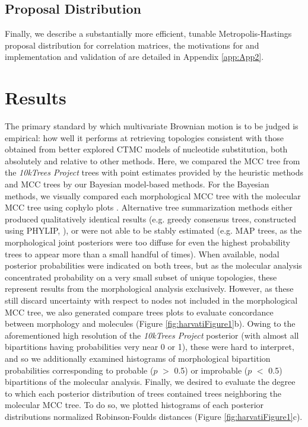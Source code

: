 \subsection{Proposal Distribution}
Finally, we describe a substantially more efficient, tunable Metropolis-Hastings proposal distribution for correlation matrices, the motivations for and implementation and validation of are detailed in Appendix \ref{app:App2}.

\clearpage

\section{Results}

The primary standard by which multivariate Brownian motion is to be judged is empirical: how well it performs at retrieving topologies consistent with those obtained from better explored CTMC models of nucleotide substitution, both absolutely and relative to other methods. Here, we compared the MCC tree from the \emph{10kTrees Project} trees with point estimates provided by the heuristic methods and MCC trees by our Bayesian model-based methods. For the Bayesian methods, we visually compared each morphological MCC tree with the molecular MCC tree using cophylo plots \citep[visible in Figure \ref{fig:harvatiFigure1}a]{revellPhytoolsPackagePhylogenetic2012}. Alternative tree summarization methods either produced qualitatively identical results (e.g. greedy consensus trees, constructed using PHYLIP, \citealp{felsensteinPHYLIPPhylogenyInference1993}), or were not able to be stably estimated (e.g. MAP trees, as the morphological joint posteriors were too diffuse for even the highest probability trees to appear more than a small handful of times). When available, nodal posterior probabilities were indicated on both trees, but as the molecular analysis concentrated probability on a very small subset of unique topologies, these represent results from the morphological analysis exclusively. However, as these still discard uncertainty with respect to nodes not included in the morphological MCC tree, we also generated compare trees plots to evaluate concordance between morphology and molecules (Figure \ref{fig:harvatiFigure1}b). Owing to the aforementioned high resolution of the \emph{10kTrees Project} posterior (with almost all bipartitions having probabilities very near 0 or 1), these were hard to interpret, and so we additionally examined histograms of morphological bipartition probabilities corresponding to probable ($p$ $>$ 0.5) or improbable ($p$ $<$ 0.5) bipartitions of the molecular analysis. Finally, we desired to evaluate the degree to which each posterior distribution of trees contained trees neighboring the molecular MCC tree. To do so, we plotted histograms of each posterior distributions normalized Robinson-Foulds distances (Figure \ref{fig:harvatiFigure1}c).

